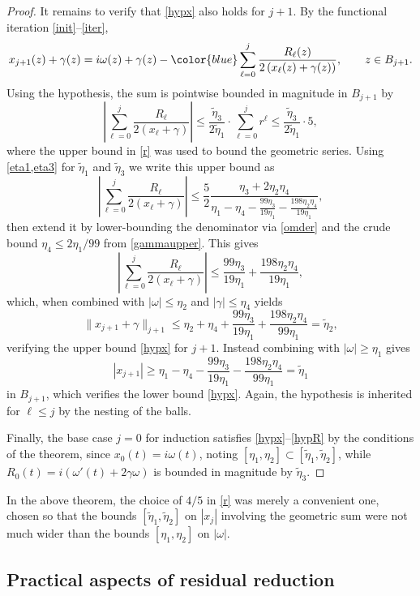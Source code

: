 \documentclass[10pt]{article}
\newcommand{\om}{\omega}
\newcommand{\g}{\gamma}
\newcommand{\te}{\tilde\eta}
\newcommand{\Fruzsi}[1]{{\color{blue}#1}}
\begin{document}
\begin{proof}
It remains to verify that \cref{hypx} also holds for $j+1$.
By the functional iteration \cref{init}--\cref{iter},
$$
x_{j+1}(z) + \g(z) = i\om(z) + \g(z) - \Fruzsi{\sum_{\ell=0}^{j} \frac{R_\ell(z)}{2 \left(x_\ell(z) + \g(z)\right)},
\qquad z\in B_{j+1}}.
$$
Using the hypothesis, the sum is pointwise bounded in magnitude
in $B_{j+1}$ by
\Fruzsi{
$$
\left|\sum_{\ell=0}^{j} \frac{R_\ell}{2\left( x_\ell + \g \right)} \right|
\leq \frac{\te_3}{2\te_1} \cdot \sum_{\ell=0}^j r^{\ell}
\leq \frac{\te_3}{2\te_1} \cdot 5,
$$
}
where the upper bound in \cref{r} was used to bound the geometric series.
\Fruzsi{Using \cref{eta1,eta3} for $\te_1$ and $\te_3$ we write this upper bound as
$$
\left|\sum_{\ell=0}^{j} \frac{R_\ell}{2\left( x_\ell + \g \right)} \right|
\leq
\frac{5}{2}\frac{\eta_3 + 2\eta_2\eta_4}{\eta_1 - \eta_4 - \frac{99\eta_3}{19\eta_1} - \frac{198\eta_2\eta_4}{19\eta_1}},
$$
then extend it by lower-bounding the denominator via \cref{omder} and the crude bound ${\eta_4 \leq 2\eta_1/99}$ from \cref{gammaupper}. This gives
$$
\left|\sum_{\ell=0}^{j} \frac{R_\ell}{2\left( x_\ell + \g \right)} \right| 
\leq
\frac{99\eta_3}{19\eta_1} + \frac{198\eta_2\eta_4}{19\eta_1},
$$
which, when combined with $|\om| \leq \eta_2$ and $|\g| \leq \eta_4$ yields
$$\|x_{j+1} + \g\|_{j+1} \le \eta_2 + \eta_4 + \frac{99\eta_3}{19\eta_1} + \frac{198\eta_2\eta_4}{99\eta_1} = \te_2,$$
verifying the upper bound \cref{hypx} for $j+1$.}
Instead combining with $|\om| \ge \eta_1$ gives
\Fruzsi{
$$ |x_{j+1}| \ge \eta_1 - \eta_4 - \frac{99\eta_3}{19\eta_1} - \frac{198\eta_2\eta_4}{99\eta_1} = \te_1 $$
} 
in $B_{j+1}$, which verifies the lower bound \cref{hypx}.
Again, the hypothesis is inherited for $\ell\le j$ by the nesting of the balls.

Finally, the base case $j=0$ for induction
satisfies \cref{hypx}--\cref{hypR}
by the conditions of the theorem,
since $x_0(t) = i\om(t)$, noting $[\eta_1,\eta_2] \subset [\te_1,\te_2]$,
while \Fruzsi{$R_0(t) = i\left(\om'(t) + 2\g\om \right)$} is bounded in magnitude by \Fruzsi{$\te_3$}.
\end{proof}

In the above theorem, the choice of $4/5$ in \cref{r} was merely a convenient one, chosen so that the bounds $[\te_1,\te_2]$ on $|x_j|$
involving the geometric sum were
not much wider than the bounds $[\eta_1,\eta_2]$ on $|\om|$.


\subsection{Practical aspects of residual reduction}
\end{document}

